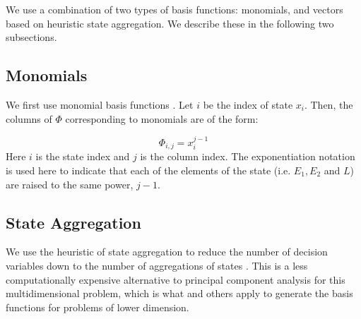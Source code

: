 \documentclass[conference]{IEEEtran}
\begin{document}
We use a combination of two types of basis functions: monomials, and vectors based on heuristic state aggregation. We describe these in the following two subsections.

\subsection{Monomials}
    We first use monomial basis functions \cite{bertsekas1995dynamic,478953}. Let $i$ be the index of state $x_{i}$. Then, the columns of $\Phi$ corresponding to monomials are of the form:
	
	\begin{displaymath}
        \Phi_{i,j}=x_{i}^{j-1}
    \end{displaymath} Here $i$ is the state index and $j$ is the column index. The exponentiation notation is used here to indicate that each of the elements of the state (i.e. $E_{1}, E_{2}$ and $L$) are raised to the same power, $j-1$. %



 \subsection{State Aggregation}
    
    We use the heuristic of state aggregation to reduce the number of decision variables down to the number of aggregations of states \cite{5717627}. This is a less computationally expensive alternative to principal component analysis for this multidimensional problem, which is what \cite{PCA2015} and others apply to generate the basis functions for problems of lower dimension.%
    
\end{document}
